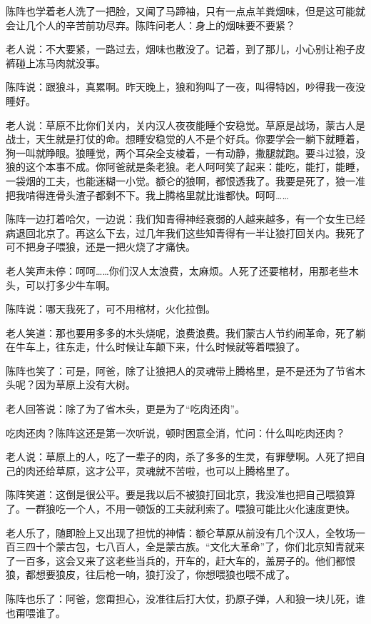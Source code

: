 \par 陈阵也学着老人洗了一把脸，又闻了马蹄袖，只有一点点羊粪烟味，但是这可能就会让几个人的辛苦前功尽弃。陈阵问老人：身上的烟味要不要紧？
\par 老人说：不大要紧，一路过去，烟味也散没了。记着，到了那儿，小心别让袍子皮裤碰上冻马肉就没事。
\par 陈阵说：跟狼斗，真累啊。昨天晚上，狼和狗叫了一夜，叫得特凶，吵得我一夜没睡好。
\par 老人说：草原不比你们关内，关内汉人夜夜能睡个安稳觉。草原是战场，蒙古人是战士，天生就是打仗的命。想睡安稳觉的人不是个好兵。你要学会一躺下就睡着，狗一叫就睁眼。狼睡觉，两个耳朵全支棱着，一有动静，撒腿就跑。要斗过狼，没狼的这个本事不成。你阿爸就是条老狼。老人呵呵笑了起来：能吃，能打，能睡，一袋烟的工夫，也能迷糊一小觉。额仑的狼啊，都恨透我了。我要是死了，狼一准把我啃得连骨头渣子都剩不下。我上腾格里就比谁都快。呵呵……
\par 陈阵一边打着哈欠，一边说：我们知青得神经衰弱的人越来越多，有一个女生已经病退回北京了。再这么下去，过几年我们这些知青得有一半让狼打回关内。我死了可不把身子喂狼，还是一把火烧了才痛快。
\par 老人笑声未停：呵呵……你们汉人太浪费，太麻烦。人死了还要棺材，用那老些木头，可以打多少牛车啊。
\par 陈阵说：哪天我死了，可不用棺材，火化拉倒。
\par 老人笑道：那也要用多多的木头烧呢，浪费浪费。我们蒙古人节约闹革命，死了躺在牛车上，往东走，什么时候让车颠下来，什么时候就等着喂狼了。
\par 陈阵也笑了：可是，阿爸，除了让狼把人的灵魂带上腾格里，是不是还为了节省木头呢？因为草原上没有大树。
\par 老人回答说：除了为了省木头，更是为了“吃肉还肉”。
\par 吃肉还肉？陈阵这还是第一次听说，顿时困意全消，忙问：什么叫吃肉还肉？
\par 老人说：草原上的人，吃了一辈子的肉，杀了多多的生灵，有罪孽啊。人死了把自己的肉还给草原，这才公平，灵魂就不苦啦，也可以上腾格里了。
\par 陈阵笑道：这倒是很公平。要是我以后不被狼打回北京，我没准也把自己喂狼算了。一群狼吃一个人，不用一顿饭的工夫就利索了。喂狼可能比火化速度更快。
\par 老人乐了，随即脸上又出现了担忧的神情：额仑草原从前没有几个汉人，全牧场一百三四十个蒙古包，七八百人，全是蒙古族。“文化大革命”了，你们北京知青就来了一百多，这会又来了这老些当兵的，开车的，赶大车的，盖房子的。他们都恨狼，都想要狼皮，往后枪一响，狼打没了，你想喂狼也喂不成了。
\par 陈阵也乐了：阿爸，您甭担心，没准往后打大仗，扔原子弹，人和狼一块儿死，谁也甭喂谁了。
